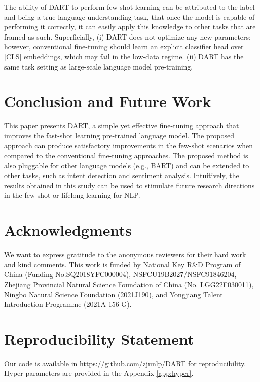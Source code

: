 \documentclass{article} \usepackage{iclr2022_conference,times}
\begin{document}
The ability of DART to perform few-shot learning can be attributed to the label and being a true language understanding task, that once the model is capable of performing it correctly, it can easily apply this knowledge to other tasks that are framed as such. 
Superficially, 
(i) DART does not optimize any new parameters; however, conventional fine-tuning should learn an explicit classifier head over [CLS] embeddings, which may fail in the low-data regime. 
(ii) DART has the same task setting as large-scale language model pre-training.



\section{Conclusion and Future Work}
This paper presents DART, a simple yet effective fine-tuning approach that improves the fast-shot learning pre-trained language model.
The proposed approach can produce satisfactory improvements in the few-shot scenarios when compared to the conventional fine-tuning approaches.
The proposed method is also pluggable for other language models (e.g., BART) and can be extended to other tasks, such as intent detection and sentiment analysis. 
Intuitively, the results obtained in this study can be used to stimulate future research directions in the few-shot or lifelong learning for NLP.
\section*{Acknowledgments}
We  want to express gratitude to the anonymous reviewers for their hard work and kind comments. This work is funded by National Key R\&D Program of China (Funding No.SQ2018YFC000004), NSFCU19B2027/NSFC91846204, Zhejiang Provincial Natural Science Foundation of China (No. LGG22F030011), Ningbo Natural Science Foundation (2021J190), and Yongjiang Talent Introduction Programme (2021A-156-G). 

\section*{Reproducibility Statement}
Our code is available in \url{https://github.com/zjunlp/DART} for reproducibility.
Hyper-parameters are provided in the Appendix \ref{app:hyper}.







\end{document}
